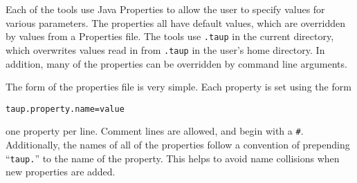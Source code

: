 Each of the tools use Java Properties to allow the user to specify values 
for various
parameters. The properties all have default values, which are overridden by
values from a Properties file. The tools use \texttt{.taup} in the 
current directory, which overwrites values read in from 
\texttt{.taup} in the user's home directory.
In addition, many of the properties can be overridden by command line arguments.

The form of the properties file is very simple. Each property is set using
the form 
\begin{verbatim}
taup.property.name=value
\end{verbatim}
 one property per line.
Comment lines are allowed, and begin with a \texttt{\#}.
Additionally, the names of all of the properties follow a convention of
prepending ``\texttt{taup.}'' to the name of the property. 
This helps to avoid name collisions when new properties
are added.

